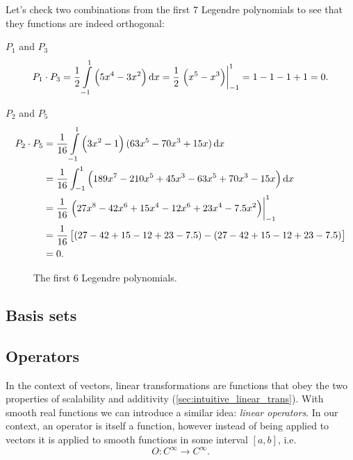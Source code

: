 Let's check two combinations from the first $7$ Legendre polynomials to see that they functions are indeed orthogonal:
\begin{listitemize}
	\item[${P_{1}}$ and $P_{3}$]
		\[
			P_{1}\cdot P_{3} = \frac{1}{2}\int\limits_{-1}^{1}\left(5x^{4}-3x^{2}\right)\dif x = \frac{1}{2}\left.\left(x^{5}-x^{3}\right)\right|_{-1}^{1} = 1-1-1+1 = 0.
		\]
	\item[$P_{2}$ and $P_{5}$]
		\begin{align*}
			P_{2}\cdot P_{5} &= \frac{1}{16}\int\limits_{-1}^{1}\left( 3x^{2}-1 \right)(63x^{5}-70x^{3}+15x)\dif x\\
							 &= \frac{1}{16} \int_{-1}^{1}\left(189x^{7}-210x^{5}+45x^{3}-63x^{5}+70x^{3}-15x\right) \dif x\\
							 &= \frac{1}{16}\left.\left(27x^{8}-42x^{6}+15x^{4}-12x^{6}+23x^{4}-7.5x^{2}\right)\right|_{-1}^{1}\\
							 &= \frac{1}{16}\left[\left(27-42+15-12+23-7.5\right) - \left(27-42+15-12+23-7.5\right)\right]\\
							 &= 0.
		\end{align*}
\end{listitemize}

\begin{figure}
	\centering
	\caption{The first $6$ Legendre polynomials.}
	\label{fig:first_n_Legendre_polynomials}
\end{figure}

\subsection{Basis sets}

\subsection{Operators}
In the context of vectors, linear transformations are functions that obey the two properties of scalability and additivity (\autoref{sec:intuitive_linear_trans}). With smooth real functions we can introduce a similar idea: \emph{linear operators}. In our context, an operator is itself a function, however instead of being applied to vectors it is applied to smooth functions in some interval $[a,b]$, i.e.
\begin{equation}
	O:C^{\infty}\to C^{\infty}.
	\label{eq:operator_definition}
\end{equation}

